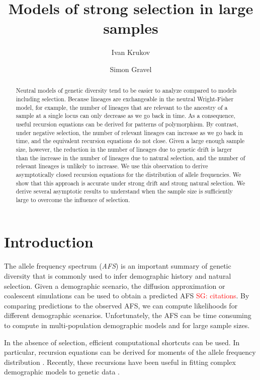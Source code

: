\documentclass[review]{elsarticle}
\newcommand{\sgcomment}[1]{\textcolor{red}{SG: #1}}
\begin{document}
\begin{frontmatter}
  \title{Models of strong selection in large samples}

  \author{Ivan Krukov}
  \author{Simon Gravel}

  \begin{abstract}
    Neutral models of genetic diversity tend to be easier to analyze compared to models including
    selection. Because lineages are exchangeable in the neutral Wright-Fisher model, for example,
    the number of lineages that are relevant to the ancestry of a sample at a single locus can only
    decrease as we go back in time. As a consequence, useful recursion equations can be derived for
    patterns of polymorphism. By contrast, under negative selection, the number of relevant lineages
    can increase as we go back in time, and the equivalent recursion equations do not close. Given a
    large enough sample size, however, the reduction in the number of lineages due to genetic drift
    is larger than the increase in the number of lineages due to natural selection, and the number
    of relevant lineages is unlikely to increase. We use this observation to derive asymptotically
    closed recursion equations for the distribution of allele frequencies. We show that this
    approach is accurate under strong drift and strong natural selection. We derive several
    asymptotic results to understand when the sample size is sufficiently large to overcome the
    influence of selection.
  \end{abstract}
\end{frontmatter}

\section{Introduction}
\label{sec:introduciton}

The allele frequency spectrum (\textit{AFS}) is an important summary of genetic diversity that is
commonly used to infer demographic history and natural selection. Given a demographic scenario, the
diffusion approximation or coalescent simulations can be used to obtain a predicted AFS
\sgcomment{citations}. By comparing predictions to the observed AFS, we can compute likelihoods for
different demographic scenarios. Unfortunately, the AFS can be time consuming to compute in
multi-population demographic models and for large sample sizes. \cite{}

In the absence of selection, efficient computational shortcuts can be used. In particular, recursion
equations can be derived for moments of the allele frequency distribution
\citep{KimuraCrow1964,Ewens1972,JouganousEtAl2017}. Recently, these recursions have been useful in
fitting complex demographic models to genetic data \citep{JouganousEtAl2017,KammEtAl2017}.
 
\end{document}
